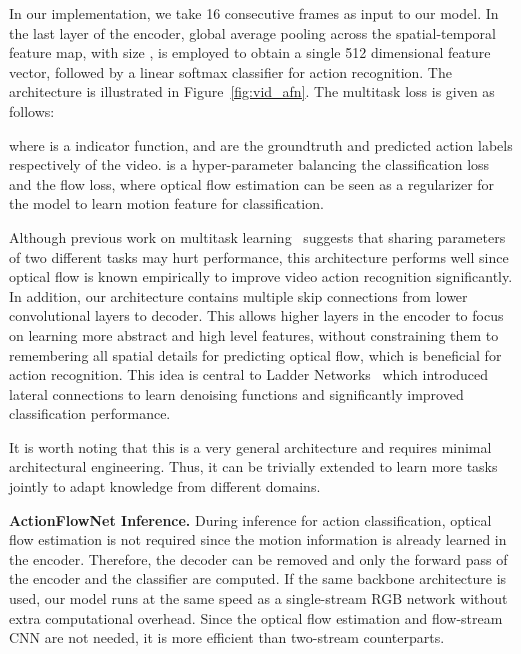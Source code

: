 \documentclass[10pt,twocolumn,letterpaper]{article}
\begin{document}
In our implementation, we take 16 consecutive frames as input to our model.
In the last layer of the encoder, global average pooling across the spatial-temporal feature map, with size , is employed to obtain a single 512 dimensional feature vector, followed by a linear softmax classifier for action recognition.  The architecture is illustrated in Figure~\ref{fig:vid_afn}.
The multitask loss is given as follows:
\vspace{-1em}

where  is a indicator function,  and  are the groundtruth and predicted action labels respectively of the  video.
 is a hyper-parameter balancing the classification loss and the flow loss, where optical flow estimation can be seen as a regularizer for the model to learn motion feature for classification.

Although previous work on multitask learning~\cite{misraSGH16} suggests that sharing parameters of two different tasks may hurt performance, this architecture performs well since optical flow is known empirically to improve video action recognition significantly.
In addition, our architecture contains multiple skip connections from lower convolutional layers to decoder.
This allows higher layers in the encoder to focus on learning more abstract and high level features, without constraining them to remembering all spatial details for predicting optical flow, which is beneficial for action recognition.
This idea is central to Ladder Networks~\cite{rasmusVHBR15} which introduced lateral connections to learn denoising functions and significantly improved classification performance.

It is worth noting that this is a very general architecture and requires minimal architectural engineering.
Thus, it can be trivially extended to learn more tasks jointly to adapt knowledge from different domains.

\noindent\textbf{ActionFlowNet Inference.}
During inference for action classification, optical flow estimation is not required since the motion information is already learned in the encoder. Therefore, the decoder can be removed and only the forward pass of the encoder and the classifier are computed. If the same backbone architecture is used, our model runs at the same speed as a single-stream RGB network without extra computational overhead. Since the optical flow estimation and flow-stream CNN are not needed, it is more efficient than two-stream counterparts.
\end{document}
